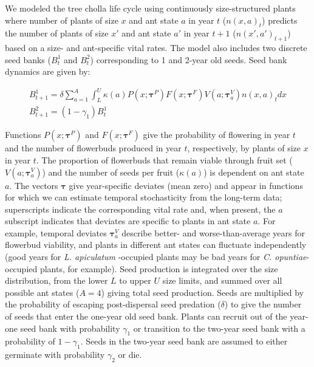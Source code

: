 \documentclass[11pt]{article}
\begin{document}
We modeled the tree cholla life cycle using continuously size-structured plants where number of plants of size $x$  and ant state $a$ in year $t$ ($n(x,a)_{t}$) predicts the number of plants of size $x'$ and ant state $a'$ in year $t+1$ ($n(x',a')_{t+1}$) based on a size- and ant-specific vital rates. 
The model also includes two discrete seed banks ($B^1_{t}$ and $B^2_{t}$) corresponding to 1 and 2-year old seeds. 
Seed bank dynamics are given by:
\begin{linenomath*}
	\begin{gather}
B^1_{t+1} = \delta \sum_{a=1}^{A} \int_L^U  \kappa(a) P(x;\pmb{\tau}^P) F(x;\pmb{\tau}^F) V(a;\pmb{\tau}^V_{a}) n(x,a)_{t} dx \\
B^2_{t+1} =  (1 - \gamma_1)B^1_{t}
	\label{eqn:IPM1}
	\end{gather}
\end{linenomath*}
\noindent %
Functions $P(x;\pmb{\tau}^P)$ and $F(x;\pmb{\tau}^F)$ give the probability of flowering in year $t$ and the number of flowerbuds produced in year $t$, respectively, by plants of size $x$ in year $t$. 
The proportion of flowerbuds that remain viable through fruit set ($V(a;\pmb{\tau}^V_{a})$) and the number of seeds per fruit ($\kappa(a)$) is dependent on ant state $a$. 
The vectors $\pmb{\tau}$ give year-specific deviates (mean zero) and appear in functions for which we can estimate temporal stochasticity from the long-term data; superscripts indicate the corresponding vital rate and, when present, the $a$ subscript indicates that deviates are specific to plants in ant state $a$.
For example, temporal deviates $\pmb{\tau}^V_{a}$ describe better- and worse-than-average years for flowerbud viability, and plants in different ant states can fluctuate independently (good years for \textit{L. apiculatum} -occupied plants may be bad years for \textit{C. opuntiae}-occupied plants, for example). 
Seed production is integrated over the size distribution, from the lower $L$ to upper $U$ size limits, and summed over all possible ant states ($A=4$) giving total seed production. 
Seeds are multiplied by the probability of escaping post-dispersal seed predation ($\delta$) to give the number of seeds that enter the one-year old seed bank. 
Plants can recruit out of the year-one seed bank with probability $\gamma_1$ or transition to the two-year seed bank with a probability of $1 - \gamma_1$. 
Seeds in the two-year seed bank are assumed to either germinate with probability $\gamma_2$ or die. 
\end{document}
